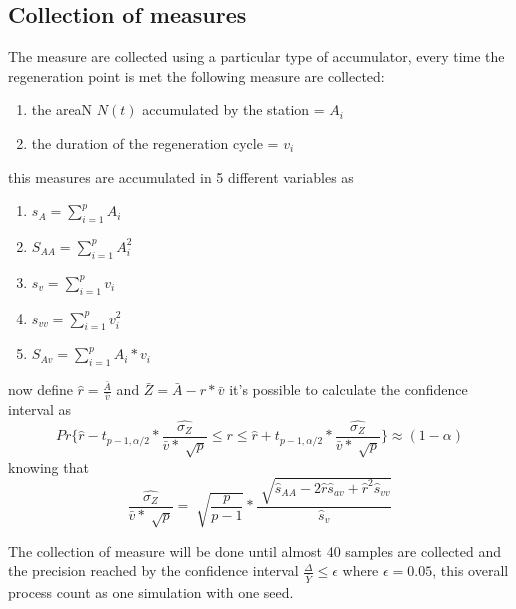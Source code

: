 \documentclass[12pt,a4paper]{article}
\begin{document}
\subsection{Collection of measures}

The measure are collected using a particular type of accumulator, every time the regeneration point is met the following measure are collected:
\begin{enumerate}
    \item the areaN $N(t)$ accumulated by the station = $A_i$
    \item the duration of the regeneration cycle = $v_i$
\end{enumerate}

this measures are accumulated in 5 different variables as 
\begin{enumerate}
    \item $s_A=\sum_{i=1}^{p} A_i$
    \item $S_{AA} = \sum_{i=1}^{p} A_i^2$
    \item $s_v = \sum_{i=1}^{p} v_i$
    \item $s_{vv} = \sum_{i=1}^{p} v_i^2$
    \item $S_{Av} = \sum_{i=1}^{p} A_i*v_i$
\end{enumerate}

now define $\hat{r}=\frac{\bar{A}}{\bar{v}}$ and $\bar{Z}=\bar{A}-r*\bar{v}$ it's possible to calculate the confidence interval as 
$$Pr\{\hat{r}-t_{p-1,\alpha/2}* \frac{\hat{\sigma_Z}}{\bar{v}*\sqrt[]{p}}  \leq r \leq \hat{r}+t_{p-1,\alpha/2}* \frac{\hat{\sigma_Z}}{\bar{v}*\sqrt[]{p}} \} \approx (1-\alpha)$$
knowing that 
$$\frac{\hat{\sigma_Z}}{\bar{v}*\sqrt[]{p}} = \sqrt[]{\frac{p}{p-1}}*\frac{\sqrt[]{\hat{s}_{AA}-2\hat{r}\hat{s}_{av}+\hat{r}^2\hat{s}_{vv}}}{\hat{s}_v}$$

The collection of measure will be done until almost 40 samples are collected and the precision reached by the confidence interval $\frac{\Delta}{\bar{Y}} \leq \epsilon$ where $\epsilon = 0.05$, this overall process count as one simulation with one seed. 
\end{document}
